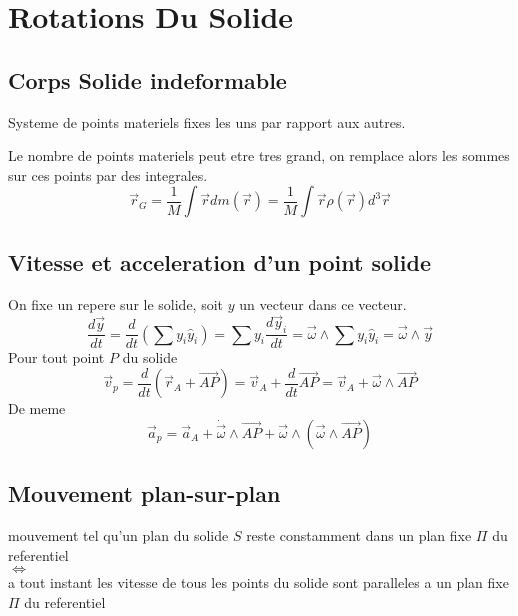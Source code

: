 \documentclass[../main.tex]{subfiles}
\begin{document}
\section{Rotations Du Solide}
\subsection{Corps Solide indeformable}
\begin{defn}
	Systeme de points materiels fixes les uns par rapport aux autres.
\end{defn}
Le nombre de points materiels peut etre tres grand, on remplace alors les sommes sur ces points par des integrales.
\[ 
	\vec{r}_G = \frac{1}{M} \int \vec{r} dm ( \vec{r}) = \frac{1}{M}\int \vec{r} \rho( \vec{r}) d^{3} \vec{r}
\]
\subsection{Vitesse et acceleration d'un point solide}
On fixe un repere sur le solide, soit $y$ un vecteur dans ce vecteur.
\[ 
	\frac{d \vec{y}}{dt}= \frac{d}{dt} ( \sum y_i \hat{y}_i) = \sum y_i \frac{d \vec{y}_i}{dt}= \vec{\omega} \land \sum y_i \hat{y}_{i} = \vec{\omega} \land \vec{y}
\]
Pour tout point $P$ du solide
\[ 
	\vec{v}_p = \frac{d}{dt}( \vec{r}_A + \vec{AP}) = \vec{v}_A + \frac{d}{dt} \vec{AP} = \vec{v}_A + \vec{\omega}\land \vec{AP}
\]
De meme
\[ 
	\vec{a}_p = \vec{a}_A + \dot{  \vec{\omega} } \land \vec{AP} + \vec{\omega} \land ( \vec{\omega} \land \vec{AP}) 
\]
\subsection{Mouvement plan-sur-plan}
\begin{defn}
	mouvement tel qu'un plan du solide $S$ reste constamment dans un plan fixe $\Pi$ du referentiel\\
	$\iff$ \\
	a tout instant les vitesse de tous les points du solide sont paralleles a un plan fixe $\Pi$ du referentiel
\end{defn}
\end{document}
